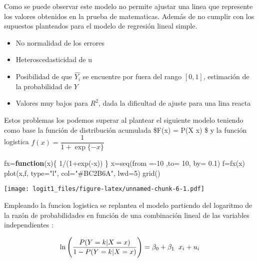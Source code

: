 \documentclass[
]{article}
\newenvironment{Shaded}{\begin{snugshade}}{\end{snugshade}}
\newcommand{\AttributeTok}[1]{\textcolor[rgb]{0.77,0.63,0.00}{#1}}
\newcommand{\ControlFlowTok}[1]{\textcolor[rgb]{0.13,0.29,0.53}{\textbf{#1}}}
\newcommand{\DecValTok}[1]{\textcolor[rgb]{0.00,0.00,0.81}{#1}}
\newcommand{\FloatTok}[1]{\textcolor[rgb]{0.00,0.00,0.81}{#1}}
\newcommand{\FunctionTok}[1]{\textcolor[rgb]{0.00,0.00,0.00}{#1}}
\newcommand{\NormalTok}[1]{#1}
\newcommand{\OtherTok}[1]{\textcolor[rgb]{0.56,0.35,0.01}{#1}}
\newcommand{\SpecialCharTok}[1]{\textcolor[rgb]{0.00,0.00,0.00}{#1}}
\newcommand{\StringTok}[1]{\textcolor[rgb]{0.31,0.60,0.02}{#1}}
\providecommand{\tightlist}{%
  \setlength{\itemsep}{0pt}\setlength{\parskip}{0pt}}
\begin{document}
Como se puede observar este modelo no permite ajustar una linea que
represente los valores obtenidos en la prueba de matematicas. Además de
no cumplir con los supuestos planteados para el modelo de regresión
lineal simple.

\begin{itemize}
\tightlist
\item
  No normalidad de los errores
\item
  Heteroscedasticidad de u
\item
  Posibilidad de que \(\widehat{Y_{i}}\) se encuentre por fuera del
  rango \([0,1]\), estimación de la probabilidad de \(Y\)
\item
  Valores muy bajos para \(R^{2}\), dada la dificultad de ajuste para
  una lina reacta
\end{itemize}

Estos problemas los podemos superar al plantear el siguiente modelo
teniendo como base la función de distribución acumulada \$F(x) = P(X
\leq x) \$ y la función logistica \(f(x)= \dfrac{1}{1+\exp{\{-x\}}}\)

\begin{Shaded}
\begin{Highlighting}[]
\NormalTok{fx}\OtherTok{=}\ControlFlowTok{function}\NormalTok{(x)\{}
   \DecValTok{1}\SpecialCharTok{/}\NormalTok{(}\DecValTok{1}\SpecialCharTok{+}\FunctionTok{exp}\NormalTok{(}\SpecialCharTok{{-}}\NormalTok{x))}
\NormalTok{\}}
\NormalTok{x}\OtherTok{=}\FunctionTok{seq}\NormalTok{(}\AttributeTok{from =}\SpecialCharTok{{-}}\DecValTok{10}\NormalTok{ ,}\AttributeTok{to=} \DecValTok{10}\NormalTok{, }\AttributeTok{by=} \FloatTok{0.1}\NormalTok{)}
\NormalTok{f}\OtherTok{=}\FunctionTok{fx}\NormalTok{(x)}
\FunctionTok{plot}\NormalTok{(x,f, }\AttributeTok{type=}\StringTok{"l"}\NormalTok{, }\AttributeTok{col=}\StringTok{"\#BC2B6A"}\NormalTok{, }\AttributeTok{lwd=}\DecValTok{5}\NormalTok{)}
\FunctionTok{grid}\NormalTok{()}
\end{Highlighting}
\end{Shaded}

\texttt{[image: logit1\_files/figure-latex/unnamed-chunk-6-1.pdf]}

Empleando la funcion logistica se replantea el modelo partiendo del
logaritmo de la razón de probabilidades en función de una combinación
lineal de las variables independientes :

\[\ln \Bigg(\dfrac{P(Y=k|X=x)}{1-P(Y=k|X=x)}\Bigg) =  \beta_{0}+ \beta_{1} \hspace{.2cm}x_{i} + u_{i}\]
\end{document}
